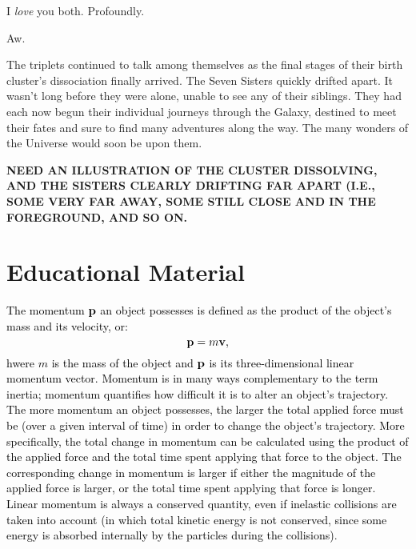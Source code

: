 \documentclass[main.tex]{subfiles}
\begin{document}
\par \Celaeno I \textit{love} you both.  Profoundly.

\par \Alcyone Aw.

\par \nar The triplets continued to talk among themselves as the final stages of their birth cluster's dissociation finally arrived.  The Seven Sisters quickly drifted apart.  It wasn't long before they were alone, unable to see any of their siblings.  They had each now begun their individual journeys through the Galaxy, destined to meet their fates and sure to find many adventures along the way.  The many wonders of the Universe would soon be upon them.


\textbf{NEED AN ILLUSTRATION OF THE CLUSTER DISSOLVING, AND THE SISTERS CLEARLY DRIFTING FAR APART (I.E., SOME VERY FAR AWAY, SOME STILL CLOSE AND IN THE FOREGROUND, AND SO ON.}

\section{Educational Material}

\begin{tcolorbox}[sharp corners, colback=blue!30, colframe=blue!80!blue, title=Box \refstepcounter{educhap2}\label{boxchap2:linI}\ref{boxchap2:linI} -- Linear Momentum I]
\par \textcolor{black} {The momentum ${\mathbf{p}}$ an object possesses is defined as the product of the object's mass and its velocity, or:
\begin{equation}
{\mathbf{p}} = m{\mathbf{v}},
\end{equation}
hwere $m$ is the mass of the object and ${\mathbf{p}}$ is its three-dimensional linear momentum vector.  Momentum is in many ways complementary to the term inertia; momentum quantifies how difficult it is to alter an object's trajectory.  The more momentum an object possesses, the larger the total applied force must be (over a given interval of time) in order to change the object's trajectory.  More specifically, the total change in momentum can be calculated using the product of the applied force and the total time spent applying that force to the object.  The corresponding change in momentum is larger if either the magnitude of the applied force is larger, or the total time spent applying that force is longer.  Linear momentum is always a conserved quantity, even if inelastic collisions are taken into account (in which total kinetic energy is not conserved, since some energy is absorbed internally by the particles during the collisions)}.  
\end{tcolorbox}
\end{document}
